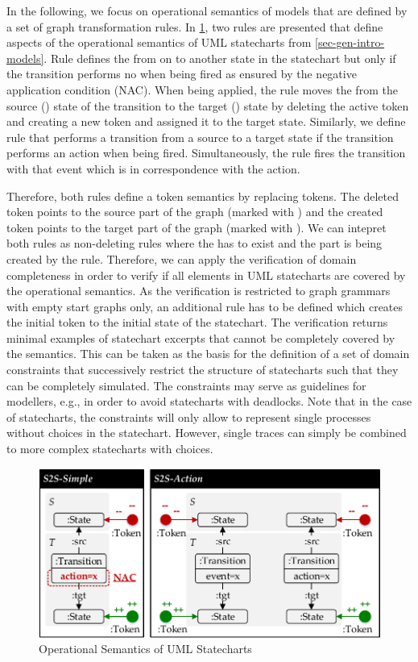 In the following, we focus on operational semantics of models that are defined by a set of graph transformation rules.
In \cref{fig:sec-compl-oper-sem:oper}, two rules are presented that define aspects of the operational semantics of UML statecharts from \cref{sec-gen-intro-models}.
Rule  defines the  from on  to another state in the statechart but only if the transition performs no  when being fired as ensured by the negative application condition (NAC).
When being applied, the rule moves the  from the source () state of the transition to the target () state by deleting the active token and creating a new token and assigned it to the target state.
Similarly, we define rule  that performs a transition from a source to a target state if the transition performs an action when being fired.
Simultaneously, the rule fires the transition with that event which is in correspondence with the action.

Therefore, both rules define a token semantics by replacing tokens.
The deleted token points to the source part of the graph (marked with ) and the created token points to the target part of the graph (marked with ).
We can intepret both rules as non-deleting rules where the  has to exist and the  part is being created by the rule.
Therefore, we can apply the verification of domain completeness in order to verify if all elements in UML statecharts are covered by the operational semantics.
As the verification is restricted to graph grammars with empty start graphs only, an additional rule has to be defined which creates the initial token to the initial state of the statechart.
The verification returns minimal examples of statechart excerpts that cannot be completely covered by the semantics.
This can be taken as the basis for the definition of a set of domain constraints that successively restrict the structure of statecharts such that they can be completely simulated.
The constraints may serve as guidelines for modellers, e.g., in order to avoid statecharts with deadlocks.
Note that in the case of statecharts, the constraints will only allow to represent single processes without choices in the statechart.
However, single traces can simply be combined to more complex statecharts with choices.

\begin{figure}[!tb]
\begin{center}
\includegraphics[width=.7\textwidth]{img/semantics/dynamic.pdf}
\end{center}
\caption{Operational Semantics of UML Statecharts}
\label{fig:sec-compl-oper-sem:oper}
\end{figure}
